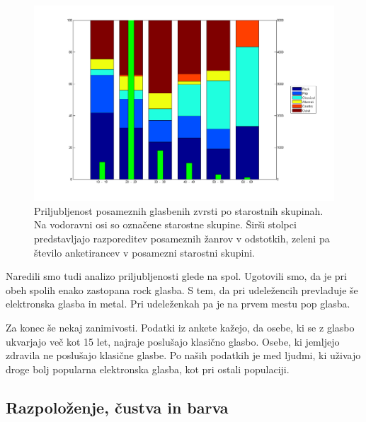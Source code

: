 \documentclass[a4paper, 12pt]{book}
\begin{document}
{\begin{figure}[hbt]
\centering
\includegraphics[width=15cm]{images/genretop1.png}

\caption{Priljubljenost posameznih glasbenih zvrsti po starostnih skupinah. Na vodoravni osi so označene starostne skupine. Širši stolpci predstavljajo razporeditev posameznih žanrov v odstotkih, zeleni pa število anketirancev v posamezni starostni skupini.  }
\label{zanrigraftop}
\end{figure}

Naredili smo tudi analizo priljubljenosti glede na spol. Ugotovili smo, da je pri obeh spolih enako zastopana rock glasba. S tem, da pri udeležencih prevladuje še elektronska glasba in metal. Pri udeleženkah pa je na prvem mestu pop glasba. 

Za konec še nekaj zanimivosti. Podatki iz ankete kažejo, da osebe, ki se z glasbo ukvarjajo več kot 15 let, najraje poslušajo klasično glasbo. Osebe, ki jemljejo zdravila ne poslušajo klasične glasbe. Po naših podatkih je med ljudmi, ki uživajo droge bolj popularna elektronska glasba, kot pri ostali populaciji.

\subsection{Razpoloženje, čustva in barva}

}
\end{document}
